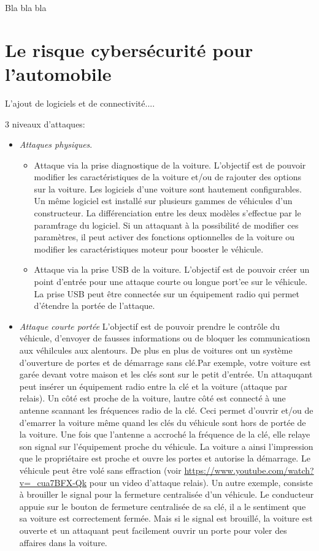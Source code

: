 Bla bla bla


\section {Le risque cybers\'ecurit\'e pour l'automobile}
 \medskip
 {\Huge L}'ajout de logiciels et de connectivit\'e....


3 niveaux d'attaques:
\begin{itemize}
\setlength\itemsep{1em}
\item \emph{Attaques physiques}. 
\begin{itemize}
\item Attaque via la prise diagnostique de la voiture. L'objectif est de pouvoir modifier les caract\'eristiques de la voiture et/ou de rajouter des options sur la voiture. Les logiciels d'une voiture sont hautement configurables. Un m\^eme logiciel est install\'e sur plusieurs gammes de v\'ehicules d'un constructeur. La diff\'erenciation entre les deux mod\`eles s'effectue par le param\'trage du logiciel. Si un attaquant \`a la possibilit\'e de modifier ces param\`etres, il peut activer des fonctions optionnelles de la voiture ou modifier les caract\'eristiques moteur pour booster le v\'ehicule.
\item Attaque via la prise USB de la voiture. L'objectif est de pouvoir cr\'eer un point d'entr\'ee pour une attaque courte ou longue port'ee sur le v\'ehicule. La prise USB peut \^etre connect\'ee sur un \'equipement radio qui permet d'\'etendre la port\'ee de l'attaque.
\end{itemize}

\item \emph{Attaque courte port\'ee} L'objectif est de pouvoir prendre le contr\^ole du v\'ehicule, d'envoyer de fausses informations ou de bloquer les communicatiosn aux v\'ehilcules aux alentours. De plus en plus de voitures ont un syst\`eme d'ouverture de portes et de d\'emarrage sans cl\'e.Par exemple, votre voiture est gar\'ee devant votre maison et les cl\'es sont sur le petit d'entr\'ee.  Un attaquqant peut ins\'erer un \'equipement radio entre la cl\'e et la voiture (attaque par relais). Un c\^ot\'e est proche de la voiture, lautre c\^ot\'e est connect\'e \`a une antenne scannant les fr\'equences radio de la cl\'e. Ceci permet d'ouvrir et/ou de d'emarrer la voiture m\^eme quand les cl\'es du v\'ehicule sont hors de port\'ee de la voiture. Une fois que l'antenne a accroch\'e la fr\'equence de la cl\'e, elle relaye son signal sur l'\'equipement proche du v\'ehicule. La voiture a ainsi l'impression que le propri\'etaire est proche et ouvre les portes et autorise la d\'emarrage. Le v\'ehicule peut \^etre vol\'e sans effraction (voir \url{https://www.youtube.com/watch?v=_cua7BFX-Qk} pour un video d'attaque relais). Un autre exemple, consiste \`a brouiller le signal pour la fermeture centralis\'ee d'un v\'ehicule. Le conducteur appuie sur le bouton de fermeture centralis\'ee de sa cl\'e, il a le sentiment que sa voiture est correctement ferm\'ee. Mais si le signal est brouill\'e, la voiture est ouverte et un attaquant peut facilement ouvrir un porte pour voler des affaires dans la voiture.
 

\end{itemize}
